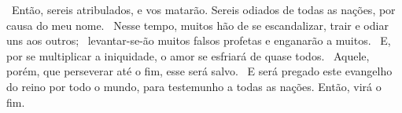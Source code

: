 \documentclass[12pt,aspectratio=169]{beamer}
\newcommand{\ver}[1]{%
    \raisebox{0.50ex}{%
        \scalebox{1.1}{%
            \pmb{\textbf{\textcolor{BSpbg}{#1}}}%
        }%
    }%
}
\newcommand{\WIDEQUOTE}[1]{%
    \par\noindent\hspace*{0.02\linewidth}%
    \begin{minipage}{0.92\linewidth}%
        \linespread{1.25}\large{#1}%
    \end{minipage}%
}
\newcommand{\RED}[1]{{\textcolor{TXred}{#1}}}
\newcommand{\ORA}[1]{{\textcolor{TXora}{#1}}}
\newcommand{\YEL}[1]{{\textcolor{TXyel}{#1}}}
\newcommand{\GRE}[1]{{\textcolor{TXgre}{#1}}}
\newcommand{\BLU}[1]{{\textcolor{TXblu}{#1}}}
\newcommand{\MAG}[1]{{\textcolor{TXmag}{#1}}}
\newcommand{\BRI}[1]{{\textcolor{BSpbg}{#1}}}   %
\begin{document}
    \begin{frame}
        \WIDEQUOTE{%
            \ver{(ARA) Mt~24.9}~Então, sereis \ORA{atribulados}, e \ORA{vos matarão}. Sereis
            \YEL{odiados de todas as nações}, por causa do meu nome.  \ver{10}~Nesse  tempo,
            muitos  hão  de  se  \GRE{escandalizar,  trair  e   odiar}   uns   aos   outros;
            \ver{11}~levantar-se-ão muitos \RED{falsos profetas} e \RED{enganarão} a muitos.
            \ver{12}~E, por se \MAG{multiplicar a iniquidade}, o amor se  \MAG{esfriará}  de
            quase todos. \ver{13}~Aquele, porém, que perseverar até o \BLU{fim},  esse  será
            salvo. \ver{14}~E será \BRI{pregado este evangelho do reino} por todo  o  mundo,
            para testemunho a todas as nações. Então, virá o \BLU{fim}.
        }
    \end{frame}




\end{document}
